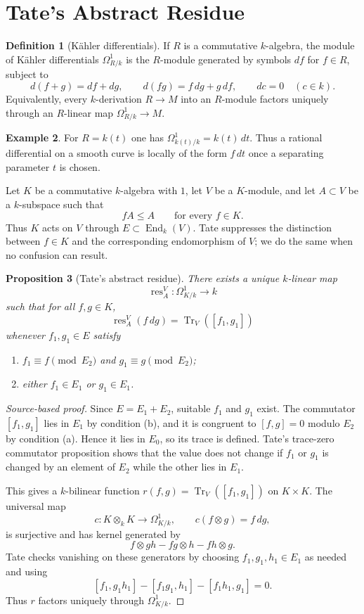 \documentclass[11pt,a4paper]{article}
\newcommand{\End}{\operatorname{End}}
\newcommand{\res}{\operatorname{res}}
\newcommand{\Tr}{\operatorname{Tr}}
\theoremstyle{definition}
\newtheorem{definition}{Definition}[section]
\newtheorem{example}[definition]{Example}
\theoremstyle{plain}
\newtheorem{proposition}[definition]{Proposition}
\theoremstyle{remark}
\begin{document}
\section{Tate's Abstract Residue}

\begin{definition}[Kähler differentials]
If $R$ is a commutative $k$-algebra, the module of Kähler differentials $\Omega^1_{R/k}$ is the $R$-module generated by symbols $df$ for $f\in R$, subject to
\[
  d(f+g)=df+dg,
  \qquad
  d(fg)=f\,dg+g\,df,
  \qquad
  dc=0\quad(c\in k).
\]
Equivalently, every $k$-derivation $R\to M$ into an $R$-module factors uniquely through an $R$-linear map $\Omega^1_{R/k}\to M$.
\end{definition}

\begin{example}
For $R=k(t)$ one has $\Omega^1_{k(t)/k}=k(t)\,dt$.  Thus a rational differential on a smooth curve is locally of the form $f\,dt$ once a separating parameter $t$ is chosen.
\end{example}

Let $K$ be a commutative $k$-algebra with $1$, let $V$ be a $K$-module, and let $A\subset V$ be a $k$-subspace such that
\[
  fA\le A\qquad\text{for every }f\in K.
\]
Thus $K$ acts on $V$ through $E\subset\End_k(V)$.  Tate suppresses the distinction between $f\in K$ and the corresponding endomorphism of $V$; we do the same when no confusion can result.

\begin{proposition}[Tate's abstract residue]
There exists a unique $k$-linear map
\[
  \res_A^V\colon \Omega^1_{K/k}\longrightarrow k
\]
such that for all $f,g\in K$,
\[
  \res_A^V(f\,dg)=\Tr_V([f_1,g_1])
\]
whenever $f_1,g_1\in E$ satisfy
\begin{enumerate}[label=(\alph*)]
\item $f_1\equiv f\pmod {E_2}$ and $g_1\equiv g\pmod {E_2}$;
\item either $f_1\in E_1$ or $g_1\in E_1$.
\end{enumerate}
\end{proposition}

\begin{proof}[Source-based proof]
Since $E=E_1+E_2$, suitable $f_1$ and $g_1$ exist.  The commutator $[f_1,g_1]$ lies in $E_1$ by condition (b), and it is congruent to $[f,g]=0$ modulo $E_2$ by condition (a).  Hence it lies in $E_0$, so its trace is defined.  Tate's trace-zero commutator proposition shows that the value does not change if $f_1$ or $g_1$ is changed by an element of $E_2$ while the other lies in $E_1$.

This gives a $k$-bilinear function $r(f,g)=\Tr_V([f_1,g_1])$ on $K\times K$.  The universal map
\[
  c\colon K\otimes_k K\longrightarrow \Omega^1_{K/k},
  \qquad c(f\otimes g)=f\,dg,
\]
is surjective and has kernel generated by
\[
  f\otimes gh-fg\otimes h-fh\otimes g.
\]
Tate checks vanishing on these generators by choosing $f_1,g_1,h_1\in E_1$ as needed and using
\[
  [f_1,g_1h_1]-[f_1g_1,h_1]-[f_1h_1,g_1]=0.
\]
Thus $r$ factors uniquely through $\Omega^1_{K/k}$.
\end{proof}
\end{document}
